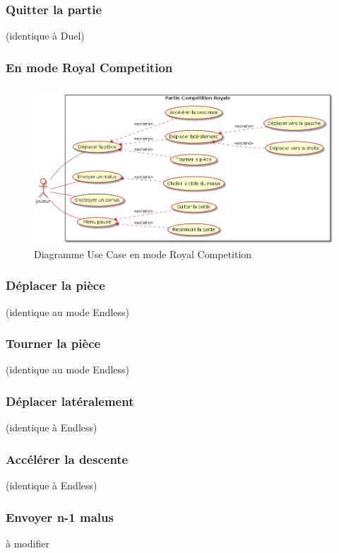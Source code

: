 \documentclass{article}
\begin{document}
\subsubsection*{Quitter la partie} (identique à Duel)

\subsubsection{En mode Royal Competition}

\begin{figure}[!h]
    \centering
    \includegraphics[width=1\textwidth]{uml/usescase/en-jeu/royal-competition.png}
    \caption{Diagramme Use Case en mode Royal Competition}
    \label{fig:Royal-Competition}
\end{figure}

\subsubsection*{Déplacer la pièce} (identique au mode Endless)
\subsubsection*{Tourner la pièce} (identique au mode Endless)
\subsubsection*{Déplacer latéralement} (identique à Endless)
\subsubsection*{Accélérer la descente} (identique à Endless)

\subsubsection*{Envoyer n-1 malus} 
à modifier 
\end{document}
